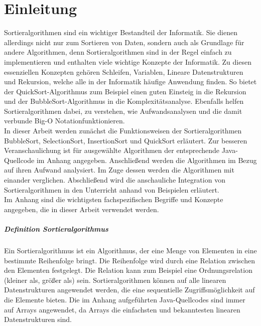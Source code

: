 \documentclass[./entry.tex]{subfiles}
\begin{document}
    \chapter{Einleitung}

    Sortieralgorithmen sind ein wichtiger Bestandteil der Informatik.
    Sie dienen allerdings nicht nur zum Sortieren von Daten,
    sondern auch als Grundlage für andere Algorithmen,
    denn Sortieralgorithmen sind in der Regel einfach zu implementieren
    und enthalten viele wichtige Konzepte der Informatik.
    Zu diesen essenziellen Konzepten gehören Schleifen,
    Variablen, Lineare Datenstrukturen und Rekursion, welche
    alle in der Informatik häufige Anwendung finden.
    So bietet der QuickSort-Algorithmus zum Beispiel einen guten Einsteig in die Rekursion
    und der BubbleSort-Algorithmus in die Komplexitätsanalyse.
    Ebenfalls helfen Sortieralgorithmen dabei, zu verstehen,
    wie Aufwandsanalysen und die damit verbunde \dq Big-O Notation\dq funktionieren. \\


    In dieser Arbeit werden zunächst die Funktionsweisen der Sortieralgorithmen
    BubbleSort, SelectionSort, InsertionSort und QuickSort erläutert.
    Zur besseren Veranschaulichung ist für ausgewählte Algorithmen der entsprechende Java-Quellcode im Anhang angegeben.
    Anschließend werden die Algorithmen im Bezug auf ihren Aufwand analysiert.
    Im Zuge dessen werden die Algorithmen mit einander verglichen.
    Abschließend wird die anschauliche Integration von Sortieralgorithmen in den Unterricht
    anhand von Beispielen erläutert. \\

    Im Anhang sind die wichtigsten fachspezifischen Begriffe und Konzepte
    angegeben, die in dieser Arbeit verwendet werden. \\

    \paragraph{Definition Sortieralgorithmus}
    Ein Sortieralgorithmus ist ein Algorithmus, der eine Menge von Elementen in eine bestimmte Reihenfolge bringt.
    Die Reihenfolge wird durch eine Relation zwischen den Elementen festgelegt.
    Die Relation kann zum Beispiel eine Ordnungsrelation (kleiner als, größer als) sein.
    Sortieralgorithmen können auf alle linearen Datenstrukturen angewendet werden,
    die eine sequentielle Zugriffsmöglichkeit auf die Elemente bieten.
    Die im Anhang aufgeführten Java-Quellcodes sind immer auf Arrays angewendet,
    da Arrays die einfachsten und bekanntesten linearen Datenstrukturen sind.
\end{document}
